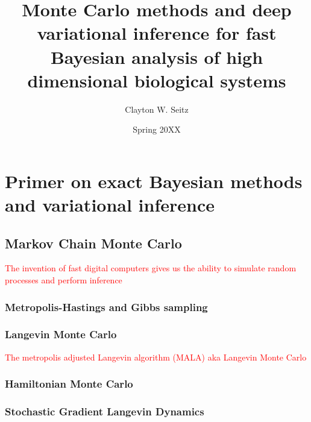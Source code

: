 \documentclass{ucetd}
\title{Monte Carlo methods and deep variational inference for fast Bayesian analysis of high dimensional biological systems}
\author{Clayton W. Seitz}
\date{Spring 20XX}
\begin{document}
\maketitle

\makecopyright


\tableofcontents


\abstract



\clearpage

\mainmatter

\chapter{Primer on exact Bayesian methods and variational inference}

\section{Markov Chain Monte Carlo}

\textcolor{red}{The invention of fast digital computers gives us the ability to simulate random processes and perform inference}

\subsection{Metropolis-Hastings and Gibbs sampling}

\subsection{Langevin Monte Carlo} 

\textcolor{red}{The metropolis adjusted Langevin algorithm (MALA) aka Langevin Monte Carlo}

\subsection{Hamiltonian Monte Carlo}

\subsection{Stochastic Gradient Langevin Dynamics}
\end{document}
